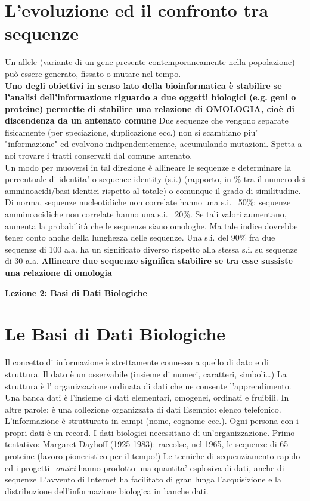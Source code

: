\documentclass{article}
\begin{document}
\section{L'evoluzione ed il confronto tra sequenze}
Un allele (variante di un gene presente contemporaneamente
nella popolazione) può essere generato, fissato o mutare nel
tempo.\\
\textbf{Uno degli obiettivi in senso lato della bioinformatica è
stabilire se l'analisi dell'informazione riguardo a due
oggetti biologici (e.g. geni o proteine) permette di stabilire
una relazione di OMOLOGIA, cioè di discendenza da un
antenato comune}
Due sequenze che vengono separate fisicamente (per speciazione,
duplicazione ecc.) non si scambiano piu' "informazione" ed evolvono
indipendentemente, accumulando mutazioni. Spetta a noi trovare i tratti
conservati dal comune antenato.\\
Un modo per muoversi in tal direzione è allineare le sequenze e determinare la
percentuale di identita' o sequence identity (s.i.) (rapporto, in \% tra il numero
dei amminoacidi/basi identici rispetto al totale) o comunque il grado di similitudine.
Di norma, sequenze nucleotidiche non correlate hanno una s.i. ~50\%; sequenze
amminoacidiche non correlate hanno una s.i. ~20\%. Se tali valori aumentano,
aumenta la probabilità che le sequenze siano omologhe. Ma tale indice dovrebbe
tener conto anche della lunghezza delle sequenze.
Una s.i. del 90\% fra due sequenze di 100 a.a. ha un significato diverso rispetto alla
stessa s.i. su sequenze di 30 a.a.
\textbf{Allineare due sequenze significa stabilire se tra esse sussiste una
relazione di omologia}
\begin{titlepage}
    \begin{center}
        \vspace*{1cm}
        \LARGE
        \textbf{Lezione 2: Basi di Dati Biologiche}
        
    \end{center}
\end{titlepage}
\section{Le Basi di Dati Biologiche}
Il concetto di informazione è strettamente connesso a quello di dato e di
struttura.
Il dato è un osservabile (insieme di numeri, caratteri, simboli…)
La struttura è l' organizzazione ordinata di dati che ne consente
l'apprendimento.\\
Una banca dati è l'insieme di dati elementari, omogenei,
ordinati e fruibili. In altre parole: è una collezione
organizzata di dati
Esempio: elenco telefonico. L'informazione è strutturata in campi (nome,
cognome ecc.). Ogni persona con i propri dati è un record.
I dati biologici necessitano di un'organizzazione. Primo tentativo:
Margaret Dayhoff (1925-1983): raccolse, nel 1965, le sequenze di
65 proteine (lavoro pioneristico per il tempo!)
Le tecniche di sequenziamento rapido ed i progetti \textit{-omici} hanno
prodotto una quantita' esplosiva di dati, anche di sequenze
L'avvento di Internet ha facilitato di gran lunga l'acquisizione e la
distribuzione dell'informazione biologica in banche dati.\\
\end{document}
